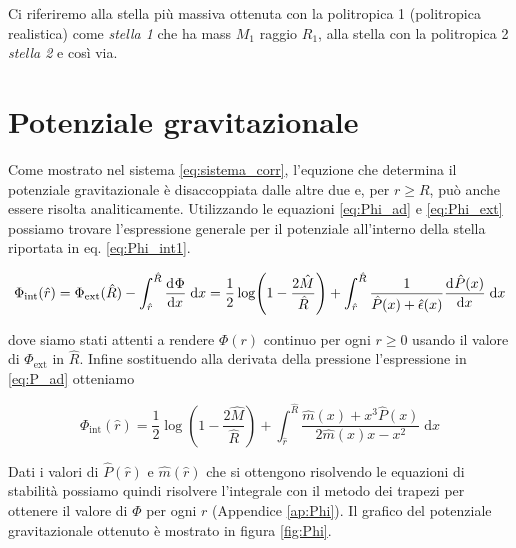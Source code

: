 \documentclass[a4paper, titlepage]{article}
\begin{document}
Ci riferiremo alla stella più massiva ottenuta con la politropica 1 (politropica
realistica) come \textit{stella 1} che ha mass $M_1$ raggio $R_1$, alla stella
con la politropica 2 \textit{ stella 2} e così via.


\section{Potenziale gravitazionale}

Come mostrato nel sistema \ref{eq:sistema_corr}, l'equzione che determina il
potenziale gravitazionale è disaccoppiata dalle altre due e, per $r \geq R$,
può anche essere risolta analiticamente.
Utilizzando le equazioni \ref{eq:Phi_ad} e \ref{eq:Phi_ext} possiamo trovare
l'espressione generale per il potenziale all'interno della stella riportata in
eq. \ref{eq:Phi_int1}.

\begin{equation}
    \Phi_\text{int} (\hat r) =
    \Phi_\text{ext} (\hat R) - \int_{\hat r}^{\hat R} \dv[]{\Phi}{x}
    \;\mathrm{d}x =
    \frac{1}{2} \log(1 - \frac{2 \hat M}{\hat R})
    + \int_{\hat r}^{\hat R} \frac{1}{\hat P (x) + \hat \epsilon (x)}
    \dv[]{\hat P (x)}{x} \;\mathrm{d}x
    \label{eq:Phi_int1}
\end{equation}

dove siamo stati attenti a rendere $\Phi (r)$ continuo per ogni $r \geq 0$
usando il valore di $\Phi_\text{ext}$ in $\hat R$. Infine sostituendo alla
derivata della pressione l'espressione in \ref{eq:P_ad} otteniamo

\begin{equation}
    \Phi_\text{int} (\hat r) =
    \frac{1}{2} \log(1 - \frac{2 \hat{M}}{\hat R}) + \int_{\hat r}^{\hat R}
    \frac{\hat m (x) + x^3 \hat P (x)}{2 \hat m (x) x - x^2}  \;\mathrm{d}x
    \label{eq:Phi_int2}
\end{equation}

Dati i valori di $\hat P (\hat r)$ e $\hat m (\hat r)$ che si ottengono
risolvendo le equazioni di stabilità possiamo quindi risolvere l'integrale con
il metodo dei trapezi per ottenere il valore di $\Phi$ per ogni $r$ (Appendice
\ref{ap:Phi}).
Il grafico del potenziale gravitazionale ottenuto è mostrato in figura
\ref{fig:Phi}.
\end{document}
